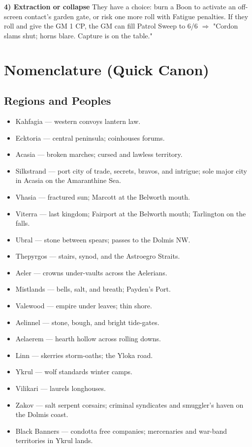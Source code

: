 \textbf{4) Extraction or collapse} They have a choice: burn a Boon to activate an off-screen contact's garden gate, or risk one more roll with Fatigue penalties. If they roll and give the GM 1 CP, the GM can fill Patrol Sweep to 6/6 $\Rightarrow$ "Cordon slams shut; horns blare. Capture is on the table."

\section{Nomenclature (Quick Canon)}

\subsection{Regions and Peoples}
\begin{itemize}
\item Kahfagia --- western convoys lantern law.
\item Ecktoria --- central peninsula; coinhouses forums.
\item Acasia --- broken marches; cursed and lawless territory.
\item Silkstrand --- port city of trade, secrets, bravos, and intrigue; sole major city in Acasia on the Amaranthine Sea.
\item Vhasia --- fractured sun; Marcott at the Belworth mouth.
\item Viterra --- last kingdom; Fairport at the Belworth mouth; Tarlington on the falls.
\item Ubral --- stone between spears; passes to the Dolmis NW.
\item Thepyrgos --- stairs, synod, and the Astroegro Straits.
\item Aeler --- crowns under-vaults across the Aelerians.
\item Mistlands --- bells, salt, and breath; Payden's Port.
\item Valewood --- empire under leaves; thin shore.
\item Aelinnel --- stone, bough, and bright tide-gates.
\item Aelaerem --- hearth hollow across rolling downs.
\item Linn --- skerries storm-oaths; the Yloka road.
\item Ykrul --- wolf standards winter camps.
\item Vilikari --- laurels longhouses.
\item Zakov --- salt serpent corsairs; criminal syndicates and smuggler's haven on the Dolmis coast.
\item Black Banners --- condotta free companies; mercenaries and war-band territories in Ykrul lands.
\end{itemize}

